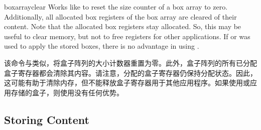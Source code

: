 \begin{docCommand}[doc new=2015-07-13]{boxarrayclear}{}
Works like  to reset the size counter of a
box array  to zero. Additionally, all allocated box registers
of the box array are cleared of their content.
Note that the allocated box registers stay allocated. So, this may be
useful to clear memory, but not to free registers for other applications.
If  or  was used to
apply the stored boxes, there is no advantage in using .

该命令与类似，将盒子阵列的大小计数器重置为零。此外，盒子阵列的所有已分配盒子寄存器都会清除其内容。请注意，分配的盒子寄存器仍保持分配状态。因此，这可能有助于清除内存，但不能释放盒子寄存器用于其他应用程序。如果使用或应用存储的盒子，则使用没有任何优势。
\begin{dispListing}
\boxarrayclear            %
\end{dispListing}
\end{docCommand}



\subsection{Storing Content}\label{subsec:magazine_storing}

